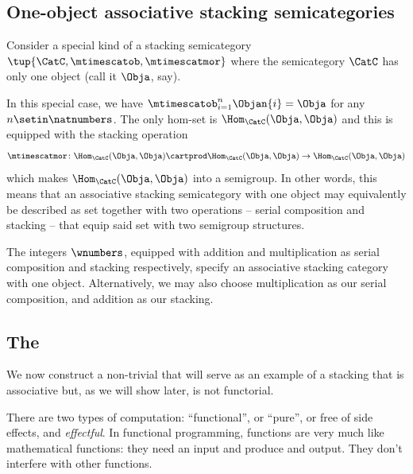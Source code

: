 %

\subsection{One-object associative stacking semicategories}

Consider a special kind of a stacking semicategory $\tup{\CatC, \mtimescatob, \mtimescatmor}$ where the semicategory $\CatC$ has only one object (call it $\Obja$, say).

In this special case, we have $\mtimescatob_{i=1}^n \Objan{i} = \Obja$ for any $n \setin \natnumbers$.
The only hom-set is $\Hom_\CatC(\Obja, \Obja)$ and this is equipped with the stacking operation
\begin{equation}
    \mtimescatmor \colon \Hom_\CatC(\Obja, \Obja) \cartprod \Hom_\CatC(\Obja, \Obja) \to \Hom_\CatC(\Obja, \Obja)
\end{equation}
which makes $\Hom_\CatC(\Obja, \Obja)$ into a semigroup.
In other words, this means that an associative stacking semicategory with one object may equivalently be described as set together with two operations -- serial composition and stacking -- that equip said set with two semigroup structures.

\begin{example}
    The integers $\wnumbers$, equipped with addition and multiplication as serial composition and stacking respectively, specify an associative stacking category with one object.
    Alternatively, we may also choose multiplication as our serial composition, and addition as our stacking.
\end{example}

\subsection{The  \Effects}

We now construct a non-trivial  that will serve as an example of a stacking  that is associative but, as we will show later, is not functorial.

There are two types of computation: ``functional'', or ``pure'', or free of side effects, and \emph{effectful}.
In functional programming, functions are very much like mathematical functions: they need an input and produce and output.
They don't interfere with other functions.

